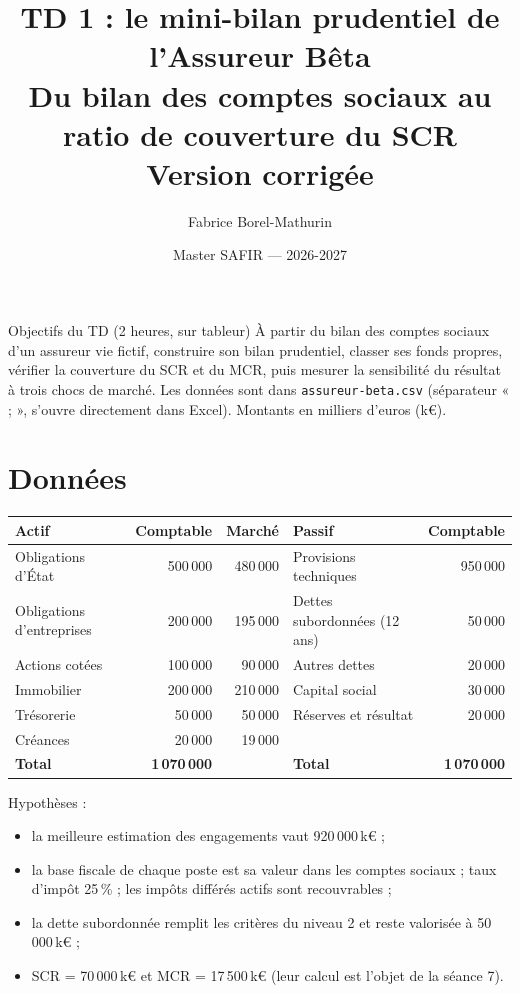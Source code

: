 \documentclass[11pt,a4paper]{article}
\title{\vspace{-1.5cm}\sffamily\bfseries\color{bleuactu}
       TD 1 : le mini-bilan prudentiel de l'Assureur Bêta\\[2mm]
       \large\mdseries\color{black}Du bilan des comptes sociaux au ratio de couverture du SCR
       \ifcorrection\\[1mm]\color{vertactu}Version corrigée\fi}
\author{\sffamily Fabrice Borel-Mathurin}
\date{\sffamily\small Master SAFIR --- 2026-2027}
\newcommand{\keur}{\,k\euro}
\begin{document}
\maketitle
\thispagestyle{empty}

\begin{notion}{Objectifs du TD (2 heures, sur tableur)}
À partir du bilan des comptes sociaux d'un assureur vie fictif, construire son bilan prudentiel,
classer ses fonds propres, vérifier la couverture du SCR et du MCR, puis mesurer la sensibilité du
résultat à trois chocs de marché. Les données sont dans \texttt{assureur-beta.csv} (séparateur
« ; », s'ouvre directement dans Excel). Montants en milliers d'euros (k\euro).
\end{notion}

\section{Données}

\begin{center}
\small
\begin{tabular}{lrr@{\qquad}lr}
\toprule
\textbf{Actif} & \textbf{Comptable} & \textbf{Marché} & \textbf{Passif} & \textbf{Comptable} \\
\midrule
Obligations d'État        & 500\,000 & 480\,000 & Provisions techniques       & 950\,000 \\
Obligations d'entreprises & 200\,000 & 195\,000 & Dettes subordonnées (12 ans) & 50\,000 \\
Actions cotées            & 100\,000 &  90\,000 & Autres dettes               &  20\,000 \\
Immobilier                & 200\,000 & 210\,000 & Capital social              &  30\,000 \\
Trésorerie                &  50\,000 &  50\,000 & Réserves et résultat        &  20\,000 \\
Créances                  &  20\,000 &  19\,000 &                             &          \\
\midrule
\textbf{Total}            & \textbf{1\,070\,000} & & \textbf{Total} & \textbf{1\,070\,000} \\
\bottomrule
\end{tabular}
\end{center}

\noindent Hypothèses :
\begin{itemize}[nosep]
  \item la meilleure estimation des engagements vaut 920\,000\keur{} ;
  \item la base fiscale de chaque poste est sa valeur dans les comptes sociaux ; taux d'impôt 25\,\% ;
        les impôts différés actifs sont recouvrables ;
  \item la dette subordonnée remplit les critères du niveau 2 et reste valorisée à 50\,000\keur{} ;
  \item SCR = 70\,000\keur{} et MCR = 17\,500\keur{} (leur calcul est l'objet de la séance 7).
\end{itemize}
\end{document}
